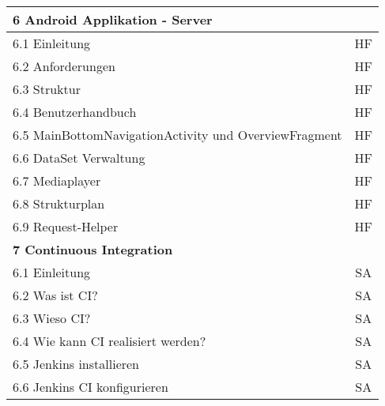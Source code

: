 \begin{longtable}{| l | l | c |}
\multicolumn{3}{|l|}{\textbf{6 Android Applikation - Server}} \\ \hline
\multicolumn{2}{|l|}{6.1 Einleitung} & HF \\
\multicolumn{2}{|l|}{6.2 Anforderungen} & HF \\
\multicolumn{2}{|l|}{6.3 Struktur} & HF \\
\multicolumn{2}{|l|}{6.4 Benutzerhandbuch} & HF \\
\multicolumn{2}{|l|}{6.5 MainBottomNavigationActivity und OverviewFragment} & HF \\
\multicolumn{2}{|l|}{6.6 DataSet Verwaltung} & HF \\
\multicolumn{2}{|l|}{6.7 Mediaplayer} & HF \\
\multicolumn{2}{|l|}{6.8 Strukturplan} & HF \\
\multicolumn{2}{|l|}{6.9 Request-Helper} & HF \\ \hline

\multicolumn{3}{|l|}{\textbf{7 Continuous Integration}} \\ \hline
\multicolumn{2}{|l|}{6.1 Einleitung} & SA \\
\multicolumn{2}{|l|}{6.2 Was ist CI?} & SA \\
\multicolumn{2}{|l|}{6.3 Wieso CI?} & SA \\
\multicolumn{2}{|l|}{6.4 Wie kann CI realisiert werden?} & SA \\
\multicolumn{2}{|l|}{6.5 Jenkins installieren} & SA \\
\multicolumn{2}{|l|}{6.6 Jenkins CI konfigurieren} & SA \\
\end{longtable}

